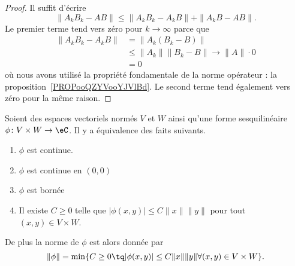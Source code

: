 \begin{proof}
    Il suffit d'écrire
    \begin{equation}
        \| A_kB_k-AB \|\leq \| A_kB_k-A_kB \|+\| A_kB-AB \|.
    \end{equation}
    Le premier terme tend vers zéro pour \( k\to\infty\) parce que
    \begin{subequations}
        \begin{align}
            \| A_kB_k-A_kB \|&=\| A_k(B_k-B) \|\\
            &\leq \| A_k \|\| B_k-B \|\to \| A \|\cdot 0\\
            &=0
        \end{align}
    \end{subequations}
    où nous avons utilisé la propriété fondamentale de la norme opérateur : la proposition~\ref{PROPooQZYVooYJVlBd}. Le second terme tend également vers zéro pour la même raison.
\end{proof}

\begin{proposition}      \label{PROPooQFTSooPFfbCc}
    Soient des espaces vectoriels normés \( V\) et \( W\) ainsi qu'une forme sesquilinéaire \( \phi\colon V\times W\to \eC\). Il y a équivalence des faits suivants.
    \begin{enumerate}
        \item
            \( \phi\) est continue.
        \item
            \( \phi\) est continue en \( (0,0)\)
        \item
            \( \phi\) est bornée
        \item
            Il existe \( C\geq 0\) telle que \( | \phi(x,y) |\leq C\| x \|\| y \|  \) pour tout \( (x,y)\in V\times W\).
    \end{enumerate}
    De plus la norme de \( \phi\) est alors donnée par
    \begin{equation}
        \| \phi \|=\min\{  C\geq 0\tq | \phi(x,y) |\leq C\| x \|\| y \|\forall (x,y)\in V\times W  \}.
    \end{equation}
\end{proposition}

